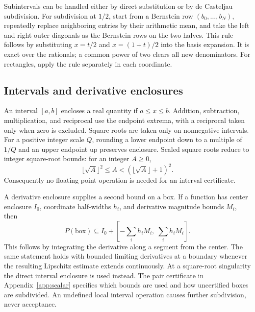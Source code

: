 Subintervals can be handled either by direct substitution or by de Casteljau subdivision.
For subdivision at \(1/2\), start from a Bernstein row
\((b_0,\ldots,b_N)\), repeatedly replace neighboring entries by their arithmetic mean, and take the left and right outer diagonals as the Bernstein rows on the two halves.
This rule follows by substituting \(x=t/2\) and \(x=(1+t)/2\) into the basis expansion.
It is exact over the rationals; a common power of two clears all new denominators.
For rectangles, apply the rule separately in each coordinate.

\subsection{Intervals and derivative enclosures}
An interval \([a,b]\) encloses a real quantity if \(a\le x\le b\).
Addition, subtraction, multiplication, and reciprocal use the endpoint extrema, with a reciprocal taken only when zero is excluded.
Square roots are taken only on nonnegative intervals.
For a positive integer scale \(Q\), rounding a lower endpoint down to a multiple of \(1/Q\) and an upper endpoint up preserves enclosure.
Scaled square roots reduce to integer square-root bounds:
for an integer \(A\ge0\),
\[
\lfloor\sqrt A\rfloor^2\le A<
(\lfloor\sqrt A\rfloor+1)^2.
\]
Consequently no floating-point operation is needed for an interval certificate.

A derivative enclosure supplies a second bound on a box.
If a function has center enclosure \(I_0\), coordinate half-widths \(h_i\), and derivative magnitude bounds \(M_i\), then
\begin{equation}\label{eq:mean-value-box}
P(\text{box})\subseteq
I_0+\left[-\sum_i h_iM_i,\;\sum_i h_iM_i\right].
\end{equation}
This follows by integrating the derivative along a segment from the center.
The same statement holds with bounded limiting derivatives at a boundary whenever the resulting Lipschitz estimate extends continuously.
At a square-root singularity the direct interval enclosure is used instead.
The pair certificate in Appendix~\ref{app:scalar} specifies which bounds are used and how uncertified boxes are subdivided.
An undefined local interval operation causes further subdivision, never acceptance.

